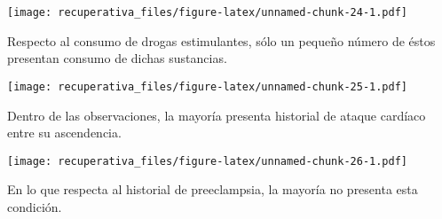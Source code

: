 \documentclass[
  spanish,
]{article}
\newenvironment{Shaded}{\begin{snugshade}}{\end{snugshade}}
\newcommand{\DataTypeTok}[1]{\textcolor[rgb]{0.13,0.29,0.53}{#1}}
\newcommand{\KeywordTok}[1]{\textcolor[rgb]{0.13,0.29,0.53}{\textbf{#1}}}
\newcommand{\NormalTok}[1]{#1}
\newcommand{\OperatorTok}[1]{\textcolor[rgb]{0.81,0.36,0.00}{\textbf{#1}}}
\newcommand{\StringTok}[1]{\textcolor[rgb]{0.31,0.60,0.02}{#1}}
\begin{document}
\texttt{[image: recuperativa\_files/figure-latex/unnamed-chunk-24-1.pdf]}

Respecto al consumo de drogas estimulantes, sólo un pequeño número de
éstos presentan consumo de dichas sustancias.

\begin{Shaded}
\end{Shaded}

\texttt{[image: recuperativa\_files/figure-latex/unnamed-chunk-25-1.pdf]}

Dentro de las observaciones, la mayoría presenta historial de ataque
cardíaco entre su ascendencia.

\begin{Shaded}
\end{Shaded}

\texttt{[image: recuperativa\_files/figure-latex/unnamed-chunk-26-1.pdf]}

En lo que respecta al historial de preeclampsia, la mayoría no presenta
esta condición.

\begin{Shaded}
\end{Shaded}
\end{document}
